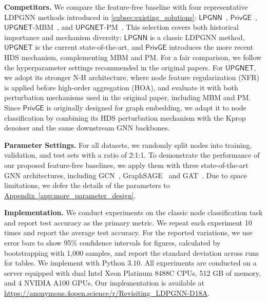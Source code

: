 \documentclass[conference,compsoc]{IEEEtran}
\theoremstyle{boldplain}
\theoremstyle{bolddefinition}
\theoremstyle{remark}
\newcommand{\appref}[1]{\hyperref[#1]{Appendix~\ref*{#1}}}
\newcommand{\mypara}[1]{\noindent\textbf{#1.}\xspace}
\newcommand{\kprop}{Kprop\xspace}
\newcommand{\hoa}{HOA\xspace}
\newcommand{\ldpgnn}{LDPGNN\xspace}
\newcommand{\lpgnn}{\ensuremath{\mathsf{LPGNN}}\xspace}
\newcommand{\upgnet}{\ensuremath{\mathsf{UPGNET}}\xspace}
\newcommand{\privge}{\ensuremath{\mathsf{PrivGE}}\xspace}
\newcommand{\mbmm}{MBM\xspace}
\newcommand{\pmm}{PM\xspace}
\newcommand{\hdsm}{HDS\xspace}
\newcommand{\nfr}{NFR\xspace}
\begin{document}
\mypara{Competitors}
We compare the feature-free baseline with four representative \ldpgnn  methods introduced in \autoref{subsec:existing_solutions}: \lpgnn~\cite{lpgNN}, \privge~\cite{privge}, \upgnet-\mbmm~\cite{upgnet-cite}, and \upgnet-\pmm~\cite{upgnet-cite}. 
\textcolor{purple!80}{This selection covers both historical importance and mechanism diversity: \lpgnn is a classic \ldpgnn method, \upgnet is the current state-of-the-art, and \privge introduces the more recent \hdsm mechanism, complementing \mbmm and \pmm.}
For a fair comparison, we follow the hyperparameter settings recommended in the original papers. 
For \upgnet, we adopt its stronger N-H architecture, where node feature regularization (\nfr) is applied before high-order aggregation (\hoa), and evaluate it with both perturbation mechanisms used in the original paper, including \mbmm and \pmm. 
Since \privge is originally designed for graph embedding, we adapt it to node classification by combining its \hdsm perturbation mechanism with the \kprop denoiser and the same downstream GNN backbones.





\vspace{0.1cm}

\mypara{Parameter Settings}
For all datasets, we randomly split nodes into training, validation, and test sets with a ratio of 2:1:1.
To demonstrate the performance of our proposed feature-free baselines, we apply them with 
three state-of-the-art GNN architectures, including GCN~\cite{kipf2017gcn}, GraphSAGE~\cite{hamilton2017graphsage} and GAT~\cite{velickovic2018gat}.
Due to space limitations, we defer the details of the parameters to 
\appref{app:more_parameter_design}. 


\vspace{0.1cm}

\mypara{Implementation}
We conduct experiments on the classic node classification task and report test accuracy as the primary metric.
We repeat each experiment 10 times and report the average test accuracy.
For the reported variations, we use error bars to show 95\% confidence intervals for figures, calculated by bootstrapping with 1,000 samples, and report the standard deviation across runs for tables.
We implement with Python 3.10. 
All experiments are conducted on a server equipped with dual Intel Xeon Platinum 8488C CPUs, 
512 GB of memory, and 4 NVIDIA A100 GPUs. Our implementation is available at \url{https://anonymous.4open.science/r/Revisiting_LDPGNN-D18A}.
\end{document}
